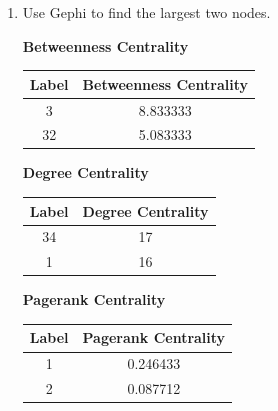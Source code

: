 \documentclass{amsart}
\theoremstyle{definition}
\theoremstyle{remark}
\numberwithin{equation}{section}
\begin{document}
\begin{enumerate}
\begin{enumerate}
\clearpage

\item Use Gephi to find the largest two nodes. \vspace{0.2cm}

\textbf{Betweenness Centrality} \vspace{0.2cm}

\begin{center}
\begin{tabular}{|c|c|}\hline
Label & Betweenness Centrality \\ \hline
3     &       8.833333         \\ \hline
32    &       5.083333         \\ \hline
\end{tabular}
\end{center}

\vspace{0.2cm}

\textbf{Degree Centrality} \vspace{0.2cm}

\begin{center}
\begin{tabular}{|c|c|}\hline
Label & Degree Centrality \\ \hline
34    &       17          \\ \hline
1     &       16          \\ \hline
\end{tabular}
\end{center}

\vspace{0.2cm}

\textbf{Pagerank Centrality} \vspace{0.2cm}

\begin{center}
\begin{tabular}{|c|c|}\hline
Label & Pagerank Centrality \\ \hline
1     &       0.246433      \\ \hline
2     &       0.087712      \\ \hline
\end{tabular}
\end{center}

\vspace{0.2cm}

\end{enumerate}


\end{enumerate}
\end{document}
